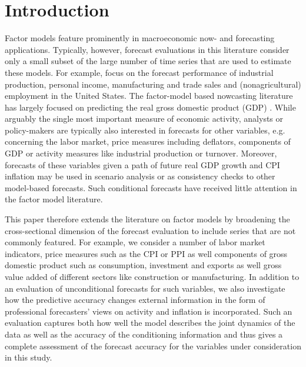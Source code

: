 \documentclass[notitlepage,a4paper,12pt]{article}
\begin{document}
    \pagebreak \pagestyle{plain} 



\section{Introduction}

Factor models feature prominently in macroeconomic now- and forecasting applications. Typically, however, forecast evaluations in this literature consider only a small subset of the large number of time series that are used to estimate these models. For example, \citet{stockwatson_2002} focus on the forecast performance of industrial production, personal income, manufacturing and trade sales and (nonagricultural) employment in the United States. The factor-model based nowcasting literature has largely focused on predicting the real gross domestic product (GDP) \citep[see][]{grs_2008, bok_etal_2018, breitungschumacher_2008, kms_jae_2013}. While arguably the single most important measure of economic activity, analysts or policy-makers are typically also interested in forecasts for other variables, e.g. concerning the labor market, price measures including deflators, components of GDP or activity measures like industrial production  or turnover. Moreover, forecasts of these variables given a path of future real GDP growth and CPI inflation may be used in scenario analysis or as consistency checks to other model-based forecasts. Such conditional forecasts have received little attention in the factor model literature.

This paper therefore extends the literature on factor models by broadening the cross-sectional dimension of the forecast evaluation to include series that are not commonly featured. For example, we consider a number of labor market indicators, price measures such as the CPI or PPI as well components of gross domestic product such as consumption, investment and exports as well gross value added of different sectors like construction or manufacturing. In addition to an evaluation of unconditional forecasts for such variables, we also investigate how the predictive accuracy changes external information in the form of professional forecasters' views on activity and inflation is incorporated. Such an evaluation captures both how well the model describes the joint dynamics of the data as well as the accuracy of the conditioning information and thus gives a complete assessment of the forecast accuracy for the variables under consideration in this study. 
\end{document}
